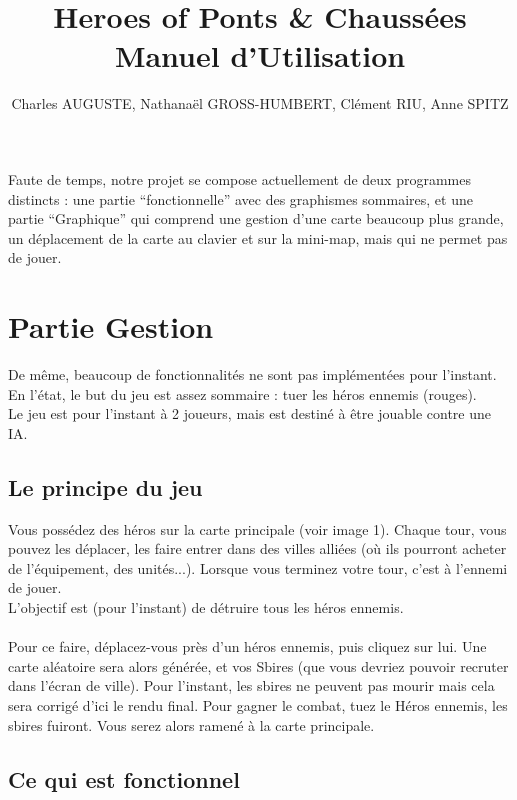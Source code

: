 \documentclass[11pt,a4paper]{article}
\begin{document}
\title{Heroes of Ponts \& Chaussées \\ Manuel d'Utilisation}
\author{Charles AUGUSTE, Nathanaël GROSS-HUMBERT, Clément RIU, Anne SPITZ}
\maketitle

Faute de temps, notre projet se compose actuellement de deux programmes distincts : une partie ``fonctionnelle'' avec des graphismes sommaires, et une partie ``Graphique'' qui comprend une gestion d'une carte beaucoup plus grande, un déplacement de la carte au clavier et sur la mini-map, mais qui ne permet pas de jouer.

\section{Partie Gestion}

De même, beaucoup de fonctionnalités ne sont pas implémentées pour l'instant. En l'état, le but du jeu est assez sommaire : tuer les héros ennemis (rouges). \\
Le jeu est pour l'instant à 2 joueurs, mais est destiné à être jouable contre une IA.

\subsection{Le principe du jeu}

Vous possédez des héros sur la carte principale (voir image 1). Chaque tour, vous pouvez les déplacer, les faire entrer dans des villes alliées (où ils pourront acheter de l'équipement, des unités...). Lorsque vous terminez votre tour, c'est à l'ennemi de jouer. \\
L'objectif est (pour l'instant) de détruire tous les héros ennemis. \\
\\
Pour ce faire, déplacez-vous près d'un héros ennemis, puis cliquez sur lui. Une carte aléatoire sera alors générée, et vos Sbires (que vous devriez pouvoir recruter dans l'écran de ville). Pour l'instant, les sbires ne peuvent pas mourir mais cela sera corrigé d'ici le rendu final. Pour gagner le combat, tuez le Héros ennemis, les sbires fuiront. Vous serez alors ramené à la carte principale.

\subsection{Ce qui est fonctionnel}
\end{document}
